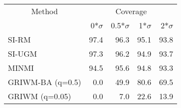 
\begin{tabular}{lrrrr}
\toprule
\multicolumn{1}{c}{Method} & \multicolumn{4}{c}{Coverage} \\
 & 0*$\sigma$ & 0.5*$\sigma$ & 1*$\sigma$ & 2*$\sigma$\\
\midrule
SI-RM & 97.4 & 96.3 & 95.1 & 93.8\\
SI-UGM & 97.3 & 96.2 & 94.9 & 93.7\\
MINMI & 94.5 & 95.6 & 94.8 & 93.3\\
GRIWM-BA (q=0.5) & 0.0 & 49.9 & 80.6 & 69.5\\
GRIWM (q=0.05) & 0.0 & 7.0 & 22.6 & 13.9\\
\bottomrule
\end{tabular}

